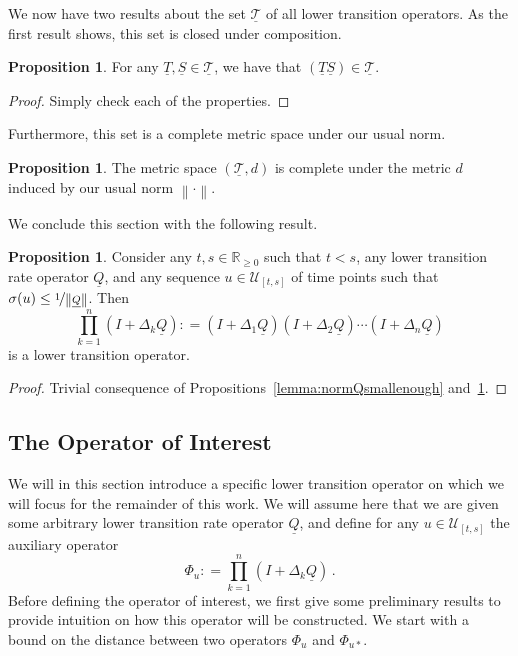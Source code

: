 \documentclass[10pt]{paper}
\theoremstyle{definition}
\newtheorem{proposition}[theorem]{Proposition}
\newcommand{\reals}{\mathbb{R}}
\newcommand{\realsnonneg}{\reals_{\geq 0}}
\newcommand{\lt}{\underline{T}}
\newcommand{\lrate}{\underline{Q}}
\newcommand{\norm}[1]{\left\lVert #1 \right\rVert}
\newcommand{\coloneqq}{:\!=}
\begin{document}
We now have two results about the set $\underline{\mathcal{T}}$ of all lower transition operators. As the first result shows, this set is closed under composition.
\begin{proposition}\label{lemma:compositioncoherence}
For any $\lt,\underline{S}\in\underline{\mathcal{T}}$, we have that $\left(\lt\underline{S}\right)\in\underline{\mathcal{T}}$.
\end{proposition}
\begin{proof}
Simply check each of the properties.
\end{proof}

\noindent Furthermore, this set is a complete metric space under our usual norm.

\begin{proposition}\label{lemma:completemetricspace}
The metric space $(\underline{\mathcal{T}},d)$ is complete under the metric $d$ induced by our usual norm $\norm{\cdot}$.
\end{proposition}

\noindent We conclude this section with the following result.
\begin{proposition}\label{lemma:productiscoherent}
Consider any $t,s\in\realsnonneg$ such that $t<s$, any lower transition rate operator $\lrate$, and any sequence $u\in\mathcal{U}_{[t,s]}$ of time points such that $\sigma(u)\leq\nicefrac{1}{\norm{\lrate}}$. Then
\begin{equation*}
\prod_{k=1}^n(I+\Delta_k\lrate)\coloneqq (I+\Delta_1\lrate)(I+\Delta_2\lrate)\cdots (I+\Delta_n\lrate)
\end{equation*}
is a lower transition operator.
\end{proposition}
\begin{proof}
Trivial consequence of Propositions~\ref{lemma:normQsmallenough} and~\ref{lemma:compositioncoherence}.
\end{proof}

\subsection{The Operator of Interest}

We will in this section introduce a specific lower transition operator on which we will focus for the remainder of this work. We will assume here that we are given some arbitrary lower transition rate operator $\lrate$, and define for any $u\in\mathcal{U}_{[t,s]}$ the auxiliary operator
\begin{equation}\label{eq:aux_lower_trans}
\Phi_u\coloneqq\prod_{k=1}^n(I+\Delta_k\lrate)\,.
\end{equation}
Before defining the operator of interest, we first give some preliminary results to provide intuition on how this operator will be constructed. We start with a bound on the distance between two operators $\Phi_u$ and $\Phi_{u*}$.
\end{document}
